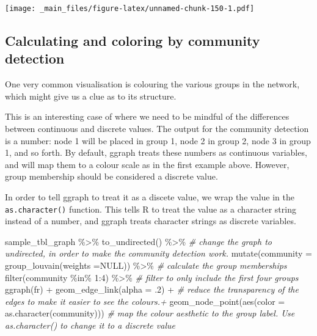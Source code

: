 \documentclass[
]{book}
\newenvironment{Shaded}{\begin{snugshade}}{\end{snugshade}}
\newcommand{\AttributeTok}[1]{\textcolor[rgb]{0.77,0.63,0.00}{#1}}
\newcommand{\CommentTok}[1]{\textcolor[rgb]{0.56,0.35,0.01}{\textit{#1}}}
\newcommand{\ConstantTok}[1]{\textcolor[rgb]{0.00,0.00,0.00}{#1}}
\newcommand{\DecValTok}[1]{\textcolor[rgb]{0.00,0.00,0.81}{#1}}
\newcommand{\FunctionTok}[1]{\textcolor[rgb]{0.00,0.00,0.00}{#1}}
\newcommand{\NormalTok}[1]{#1}
\newcommand{\SpecialCharTok}[1]{\textcolor[rgb]{0.00,0.00,0.00}{#1}}
\newcommand{\StringTok}[1]{\textcolor[rgb]{0.31,0.60,0.02}{#1}}
\begin{document}
\texttt{[image: \_main\_files/figure-latex/unnamed-chunk-150-1.pdf]}

\hypertarget{calculating-and-coloring-by-community-detection}{%
\subsection{Calculating and coloring by community detection}\label{calculating-and-coloring-by-community-detection}}

One very common visualisation is colouring the various groups in the network, which might give us a clue as to its structure.

This is an interesting case of where we need to be mindful of the differences between continuous and discrete values. The output for the community detection is a number: node 1 will be placed in group 1, node 2 in group 2, node 3 in group 1, and so forth. By default, ggraph treats these numbers as continuous variables, and will map them to a colour scale as in the first example above. However, group membership should be considered a discrete value.

In order to tell ggraph to treat it as a discete value, we wrap the value in the \texttt{as.character()} function. This tells R to treat the value as a character string instead of a number, and ggraph treats character strings as discrete variables.

\begin{Shaded}
\begin{Highlighting}[]
\NormalTok{sample\_tbl\_graph }\SpecialCharTok{\%\textgreater{}\%} 
 \FunctionTok{to\_undirected}\NormalTok{() }\SpecialCharTok{\%\textgreater{}\%} \CommentTok{\# change the graph to undirected, in order to make the community detection work.}
  \FunctionTok{mutate}\NormalTok{(}\AttributeTok{community =} \FunctionTok{group\_louvain}\NormalTok{(}\AttributeTok{weights =}\ConstantTok{NULL}\NormalTok{)) }\SpecialCharTok{\%\textgreater{}\%} \CommentTok{\# calculate the group memberships}
  \FunctionTok{filter}\NormalTok{(community }\SpecialCharTok{\%in\%} \DecValTok{1}\SpecialCharTok{:}\DecValTok{4}\NormalTok{) }\SpecialCharTok{\%\textgreater{}\%} \CommentTok{\# filter to only include the first four groups}
  \FunctionTok{ggraph}\NormalTok{(}\StringTok{\textquotesingle{}fr\textquotesingle{}}\NormalTok{)  }\SpecialCharTok{+} 
  \FunctionTok{geom\_edge\_link}\NormalTok{(}\AttributeTok{alpha =}\NormalTok{ .}\DecValTok{2}\NormalTok{) }\SpecialCharTok{+}  \CommentTok{\# reduce the transparency of the edges to make it easier to see the colours.+ }
  \FunctionTok{geom\_node\_point}\NormalTok{(}\FunctionTok{aes}\NormalTok{(}\AttributeTok{color =} \FunctionTok{as.character}\NormalTok{(community)))  }\CommentTok{\# map the colour aesthetic to the group label. Use as.character() to change it to a discrete value}
\end{Highlighting}
\end{Shaded}
\end{document}
